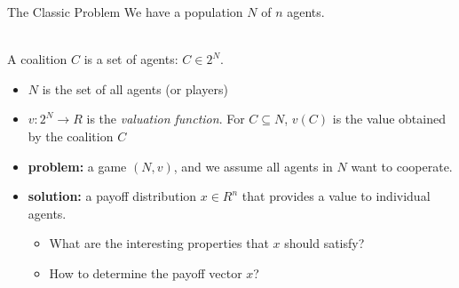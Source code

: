 \documentclass{beamer}
\begin{document}
\begin{frame}{The Classic Problem}
    We have a population $N$ of $n$ agents.
    \begin{definition} [Coalition]~\\
       A coalition $C$ is a set of agents: $C \in 2^N$.
        \begin{itemize}
            \item $N$ is the set of all agents (or players)
            \item $v:2^N \rightarrow R$ is the \emph{valuation function}. For $C \subseteq N$, $v(C)$ is the value obtained by the coalition $C$
        \end{itemize}
        \label {dfn:Coalition}
    \end{definition}

    \begin{itemize}
        \item \textbf{problem:} a game $(N,v)$, and we assume all agents in $N$ want to cooperate.
        \item \textbf{solution:} a payoff distribution $x \in R^n$ that provides a value to individual agents.

        \begin{itemize}
            \item What are the interesting properties that $x$ should satisfy?
            \item How to determine the payoff vector $x$?
        \end{itemize}

    \end{itemize}
\end{frame}
\end{document}
